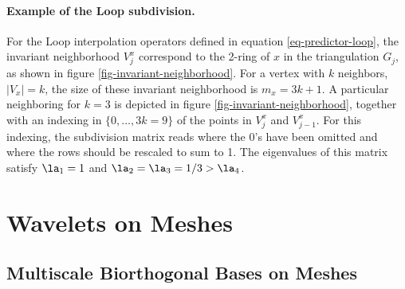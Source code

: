\paragraph{Example of the Loop subdivision.}

For the Loop interpolation operators defined in equation \eqref{eq-predictor-loop}, the invariant neighborhood $V_j^x$ correspond to the 2-ring of $x$ in the triangulation $G_j$, as shown in figure \ref{fig-invariant-neighborhood}. For a vertex with $k$ neighbors, $|V_x|=k$, the size of these invariant neighborhood is $m_x = 3k+1$. A particular neighboring for $k=3$ is depicted in figure \ref{fig-invariant-neighborhood}, together with an indexing in $\{0,\ldots,3k=9\}$ of the points in $V_j^x$ and $V_{j-1}^x$. For this indexing, the subdivision matrix reads
where the 0's have been omitted and where the rows should be rescaled to sum to 1. The eigenvalues of this matrix satisfy $\la_1=1$ and $\la_2=\la_3=1/3 > \la_4$.


\section{Wavelets on Meshes}

\subsection{Multiscale Biorthogonal Bases on Meshes}

